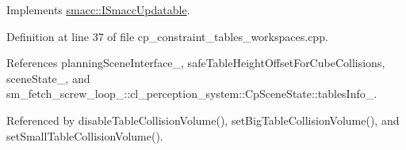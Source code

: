 Implements \hyperlink{classsmacc_1_1ISmaccUpdatable_a84ee0520cbefdb1d412bed54650b028e}{smacc\+::\+I\+Smacc\+Updatable}.



Definition at line 37 of file cp\+\_\+constraint\+\_\+tables\+\_\+workspaces.\+cpp.



References planning\+Scene\+Interface\+\_\+, safe\+Table\+Height\+Offset\+For\+Cube\+Collisions, scene\+State\+\_\+, and sm\+\_\+fetch\+\_\+screw\+\_\+loop\+\_\+::cl\+\_\+perception\+\_\+system\+::\+Cp\+Scene\+State\+::tables\+Info\+\_\+.



Referenced by disable\+Table\+Collision\+Volume(), set\+Big\+Table\+Collision\+Volume(), and set\+Small\+Table\+Collision\+Volume().


